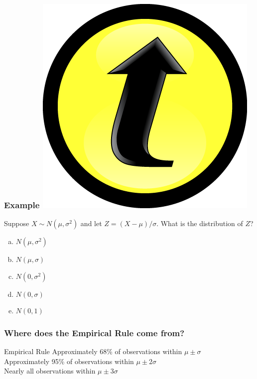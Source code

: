 \documentclass[handout]{beamer}
\begin{document}
\begin{frame}
\frametitle{Example \hfill \includegraphics[scale = 0.05]{./images/clicker}}
Suppose $X \sim N(\mu, \sigma^2)$ and let $Z = (X -\mu)/\sigma$. What is the distribution of $Z$?

\begin{enumerate}[(a)]
	\item $N(\mu, \sigma^2)$
	\item $N(\mu, \sigma)$
	\item $N(0, \sigma^2)$
	\item  $N(0, \sigma)$
	\item $N(0,1)$
\end{enumerate}
\end{frame}

\begin{frame}
\frametitle{Where does the Empirical Rule come from?}

\begin{block}{Empirical Rule}
Approximately 68\% of observations within $\mu\pm \sigma$\\
Approximately 95\% of observations within $\mu\pm 2 \sigma$\\
Nearly all observations within $\mu\pm 3 \sigma$
\end{block}
\end{frame}

\end{document}
